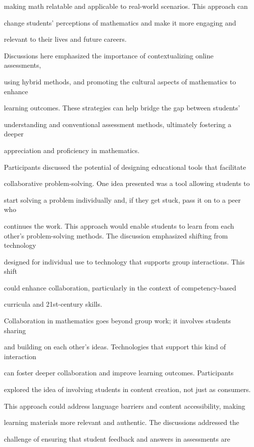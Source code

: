 \documentclass[11pt]{article}
\begin{document}
making math relatable and applicable to real-world scenarios. This approach can

change students' perceptions of mathematics and make it more engaging and

relevant to their lives and future careers.

Discussions here emphasized the importance of contextualizing online assessments,

using hybrid methods, and promoting the cultural aspects of mathematics to enhance

learning outcomes. These strategies can help bridge the gap between students'

understanding and conventional assessment methods, ultimately fostering a deeper

appreciation and proficiency in mathematics.

Participants discussed the potential of designing educational tools that facilitate

collaborative problem-solving. One idea presented was a tool allowing students to

start solving a problem individually and, if they get stuck, pass it on to a peer who

continues the work. This approach would enable students to learn from each other's problem-solving methods. The discussion emphasized shifting from technology

designed for individual use to technology that supports group interactions. This shift

could enhance collaboration, particularly in the context of competency-based

curricula and 21st-century skills.

Collaboration in mathematics goes beyond group work; it involves students sharing

and building on each other's ideas. Technologies that support this kind of interaction

can foster deeper collaboration and improve learning outcomes. Participants

explored the idea of involving students in content creation, not just as consumers.

This approach could address language barriers and content accessibility, making

learning materials more relevant and authentic. The discussions addressed the

challenge of ensuring that student feedback and answers in assessments are
\end{document}
